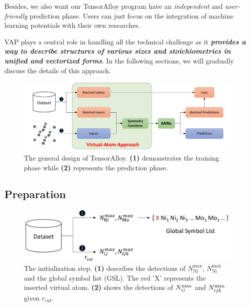 \documentclass[preprint]{revtex4-2}
\begin{document}
Besides, we also want our TensorAlloy program have an \textit{independent} and
\textit{user-friendly} prediction phase. Users can just focus on the integration 
of machine learning potentials with their own researches.

VAP plays a central role in handling all the technical challenge as it 
\textbf{\textit{provides a way to describe structures of various sizes and 
stoichiometries in unified and vectorized forms}}. 
In the following sections, we will gradually discuss the details of this 
approach.

% 
%
\begin{figure}[h!]
\centering
\includegraphics[scale=0.68]{figures/Fig1.pdf}
\caption{\label{fig:program_design} The general design of TensorAlloy. 
\textbf{(1)} demonstrates the training phase while \textbf{(2)} represents the 
prediction phase.
}
\end{figure}

% 
%
\subsection{Preparation}
\label{section:preparation}

% 
%
\begin{figure}[h!]
\centering
\includegraphics[scale=0.6]{figures/Fig2.pdf}
\caption{\label{fig:Fig2} The initialization step. 
\textbf{(1)} describes the detections of $N_{\mathrm{Ni}}^{\mathrm{max}}$, 
$N_{\mathrm{Ni}}^{\mathrm{max}}$ and the global symbol list (GSL). The red 'X' 
represents the inserted virtual atom.
\textbf{(2)} shows the detections of $N_{ij}^{\mathrm{max}}$ and $N_{ijk}^{\mathrm{max}}$ given $r_{cut}$.
}
\end{figure}
\end{document}
